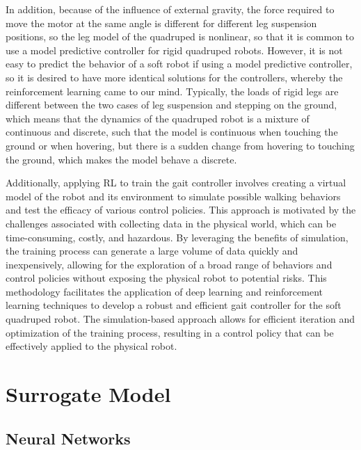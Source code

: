 In addition, because of the influence of external gravity, the force required to move the motor at the same angle is different for different leg suspension positions, so the leg model of the quadruped is nonlinear, so that it is common to use a model predictive controller for rigid quadruped robots. However, it is not easy to predict the behavior of a soft robot if using a model predictive controller\cite{BemporadLinearTimevaryingNonlinearMPC}, so it is desired to have more identical solutions for the controllers, whereby the  reinforcement learning came to our mind\cite{hewingLearningbasedModelPredictive2020}. Typically, the loads of rigid legs are different between the two cases of leg suspension and stepping on the ground\cite{biswalDevelopmentQuadrupedWalking2021}, which means that the dynamics of the quadruped robot is a mixture of continuous and discrete, such that the model is continuous when touching the ground or when hovering, but there is a sudden change from hovering to touching the ground, which makes the model behave a discrete. 

Additionally, applying \ac{RL} to train the gait controller involves creating a virtual model of the robot and its environment to simulate possible walking behaviors and test the efficacy of various control policies. This approach is motivated by the challenges associated with collecting data in the physical world, which can be time-consuming, costly, and hazardous. By leveraging the benefits of simulation, the training process can generate a large volume of data quickly and inexpensively, allowing for the exploration of a broad range of behaviors and control policies without exposing the physical robot to potential risks. This methodology facilitates the application of deep learning and reinforcement learning techniques to develop a robust and efficient gait controller for the soft quadruped robot. The simulation-based approach allows for efficient iteration and optimization of the training process, resulting in a control policy that can be effectively applied to the physical robot.

\section{Surrogate Model}

\subsection{Neural Networks}


